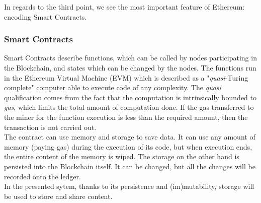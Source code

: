 \documentclass[hidelinks,conference,compsoc]{IEEEtran}
\begin{document}
In regards to the third point, we see the most important feature of Ethereum: encoding Smart Contracts. 


\subsubsection{Smart Contracts}

Smart Contracts describe functions, which can be called by nodes participating in the Blockchain, and states which can be changed by the nodes. 
The functions run in the Ethereum Virtual Machine (EVM)
which is described as a "\textit{quasi}-Turing complete" computer able to execute code of any complexity. The \textit{quasi} qualification comes from the
fact that the computation is intrinsically bounded to \textit{gas}, which limits the total amount of computation done.
If the gas transferred to the miner for the function execution is less than the required amount, then the transaction is not carried out.  
\\The contract can use memory and storage to save data. It can use any amount of memory (paying gas) during the execution of its code, but when execution ends, the entire content of the memory is wiped. The storage on the other hand is persisted into the Blockchain itself. It can be changed, but all the changes will be recorded onto the ledger.\\
In the presented sytem, thanks to its persistence and (im)mutability, storage will be used to store and share content. 
\end{document}
